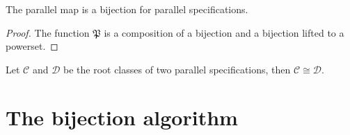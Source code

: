 \begin{proposition}
The parallel map is a bijection for parallel specifications.
\end{proposition}
\begin{proof}
The function $\mathfrak{P}$ is a composition of a bijection and a bijection lifted to a powerset.
\end{proof}
\begin{corollary}
Let $\mathcal{C}$ and $\mathcal{D}$ be the root classes of two parallel specifications, then $\mathcal{C} \cong \mathcal{D}$.
\end{corollary}

\section{The bijection algorithm}
